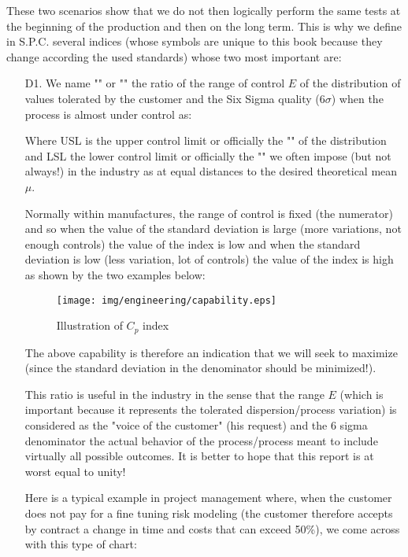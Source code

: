 These two scenarios show that we do not then logically perform the same  tests at the beginning of the production and then on the long term. This is why we define in S.P.C. several indices (whose symbols are unique to this book because they change according the used standards) whose two most important are:
	\begin{enumerate}
		\item[D1.] We name "" or "" the ratio of the range of control $E$  of the distribution of values tolerated by the customer and the Six Sigma quality ($6 \sigma$) when the process is almost under control as:
			
		Where USL is the upper control limit or officially the "" of the distribution and LSL the lower control limit or officially the "" we often impose (but not always!) in the industry as at equal distances to the desired theoretical mean $\mu$. 
		
		Normally within manufactures, the range of control is fixed (the numerator) and so when the value of the standard deviation is large (more variations, not enough controls) the value of the index is low and when the standard deviation is low (less variation, lot of controls) the value of the index is high as shown by the two examples below:
		
		\begin{figure}[H]
		\centering
		\texttt{[image: img/engineering/capability.eps]}
		\caption{Illustration of $C_p$ index}
		\end{figure}
		
		The above capability is therefore an indication that we will seek to maximize (since the standard deviation in the denominator should be minimized!).
		
		This ratio is useful in the industry in the sense that the range $E$ (which is important because it represents the tolerated dispersion/process variation\label{range six sigma}) is considered as the "voice of the customer" (his request) and the $6$ sigma denominator the actual behavior of the process/process meant to include virtually all possible outcomes. It is better to hope that this report is at worst equal to unity!
		
		Here is a typical example in project management where, when the customer does not pay for a fine tuning risk modeling (the customer therefore accepts by contract a change in time and costs that can exceed 50\%), we come across with this type of chart:
		

\end{enumerate}
